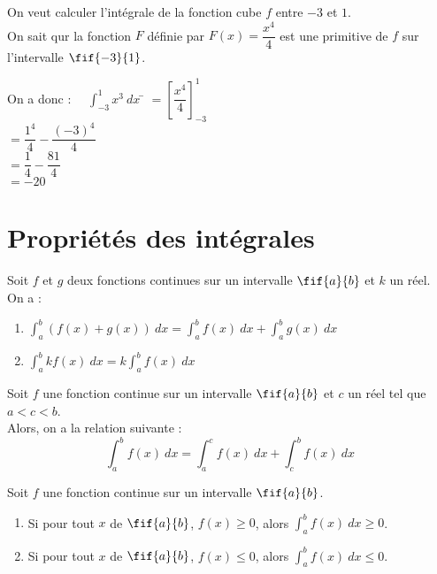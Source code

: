 \documentclass[a4paper,11pt,cours]{nsi} %
\begin{document}
\begin{exemple}[]
    On veut calculer l'intégrale de la fonction cube $f$ entre $-3$ et $1$.\\
    On sait qur la fonction $F$ définie par $F(x)=\dfrac{x^4}{4}$ est une primitive de $f$ sur l'intervalle $\fif{-3}{1}$.
    
    \begin{tabbing}
        On a donc : $\quad \displaystyle \int_{-3}^1 x^3 \ dx$ \= $=\displaystyle \left[\dfrac{x^4}{4}\right]_{-3}^1$\\[.5em]
        \> $=\dfrac{1^4}{4}-\dfrac{(-3)^4}{4}$\\[.5em]
        \> $=\dfrac{1}{4}-\dfrac{81}{4}$\\[.5em]
        \> $=-20$   
    \end{tabbing}
\end{exemple}

\section{Propriétés des intégrales}
\begin{propriete}[s algébriques]
    Soit $f$ et $g$ deux fonctions continues sur un intervalle $\fif{a}{b}$ et $k$ un réel.\\
    On a :
    \begin{enumerate}[label=\textbullet]
        \item $\displaystyle \int_a^b (f(x)+g(x)) \ dx = \int_a^b f(x) \ dx + \int_a^b g(x) \ dx$
        \item $\displaystyle \int_a^b kf(x) \ dx = k\int_a^b f(x) \ dx$
    \end{enumerate}
\end{propriete}

\begin{propriete}
    Soit $f$ une fonction continue sur un intervalle $\fif{a}{b}$ et $c$ un réel tel que $a < c < b$.\\
    Alors, on a la relation suivante :
    $$\int_a^b f(x) \ dx = \int_a^c f(x) \ dx + \int_c^b f(x) \ dx$$
\end{propriete}

\begin{propriete}
    Soit $f$ une fonction continue sur un intervalle $\fif{a}{b}$.
    \begin{enumerate}[label=\textbullet]
        \item Si pour tout $x$ de $\fif{a}{b}$, $f(x) \geqslant 0$, alors $\displaystyle \int_a^b f(x) \ dx \geqslant 0$.
        \item Si pour tout $x$ de $\fif{a}{b}$, $f(x) \leqslant 0$, alors $\displaystyle \int_a^b f(x) \ dx \leqslant 0$.
    \end{enumerate}
\end{propriete}
\end{document}
